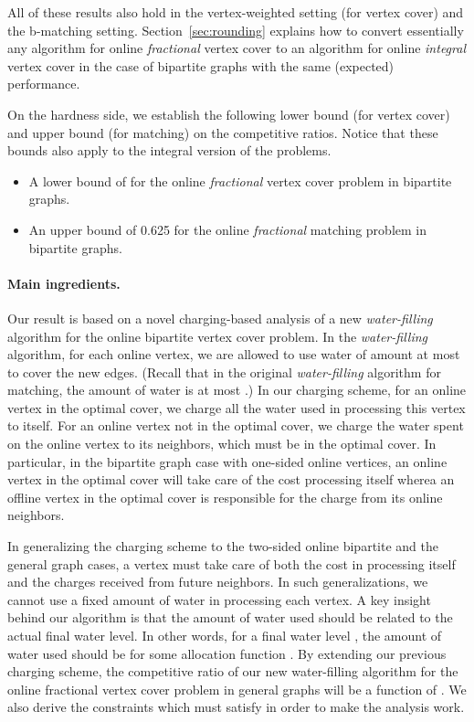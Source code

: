 \documentclass{article}
\begin{document}
All of these results also hold in the vertex-weighted setting (for vertex cover) and the b-matching setting.
Section~\ref{sec:rounding} explains how to convert essentially any algorithm for online {\em fractional} vertex cover to an algorithm for online {\em integral} vertex cover in the case of bipartite graphs with the same (expected) performance. 



On the hardness side, we establish the following lower bound (for vertex cover) and upper bound (for matching) on the competitive ratios. Notice that these bounds also apply to the integral version of the problems.
\begin{itemize}
\item A lower bound of  for the  online {\em fractional} vertex cover problem in bipartite graphs.
\item An upper bound of 0.625 for the online {\em fractional} matching problem in bipartite graphs. 
\end{itemize}

\paragraph{Main ingredients.}
Our result is based on a novel charging-based analysis of a new {\em water-filling} algorithm for the online bipartite vertex cover problem. In the {\em water-filling} algorithm, for each online vertex, we are allowed to use water of amount at most  to cover the new edges. (Recall that in the original {\em water-filling} algorithm for matching, the amount of water is at most .) In our charging scheme, for an online vertex in the optimal cover, we charge all the water used in processing this vertex to itself. For an online vertex not in the optimal cover, we charge the water spent on the online vertex to its neighbors, which must be in the optimal cover. In particular, in the bipartite graph case with one-sided online vertices, an online vertex in the optimal cover will take care of the cost processing itself wherea an offline vertex in the optimal cover is responsible for the charge from its online neighbors. 

In generalizing the charging scheme to the two-sided online bipartite and the general graph cases, a vertex must take care of both the cost in processing itself and the charges received from future neighbors. In such generalizations, we cannot use a fixed amount of water in processing each vertex. A key insight behind our algorithm is that the amount of water used should be related to the actual final water level. In other words, for a final water level , the amount of water used should be  for some allocation function . By extending our previous charging scheme, the competitive ratio of our new water-filling algorithm for the online fractional vertex cover problem in general graphs will be a function of . We also derive the constraints which  must satisfy in order to make the analysis work.
\end{document}
